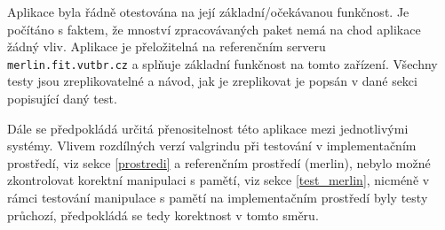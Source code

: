 \documentclass[11pt, a4paper, hidelinks]{article}[08.10.2023]
\begin{document}
    Aplikace byla řádně otestována na její základní/očekávanou funkčnost. Je počítáno s faktem, že mnoství zpracovávaných paket nemá na chod aplikace žádný vliv. Aplikace je přeložitelná na referenčním serveru \\ \texttt{merlin.fit.vutbr.cz} a splňuje základní funkčnost na tomto zařízení.
    Všechny testy jsou zreplikovatelné a návod, jak je zreplikovat je popsán v dané sekci popisující daný test.

    Dále se předpokládá určitá přenositelnost této aplikace mezi jednotlivými systémy. Vlivem rozdílných verzí valgrindu při testování v implementačním prostředí, viz sekce \ref{prostredi} a referenčním prostředí (merlin), nebylo možné zkontrolovat korektní manipulaci s pamětí, viz sekce \ref{test_merlin}, nicméně v rámci testování manipulace s pamětí na implementačním prostředí byly testy průchozí, předpokládá se tedy korektnost v tomto směru. 


    \pagebreak

    
    
\end{document}
